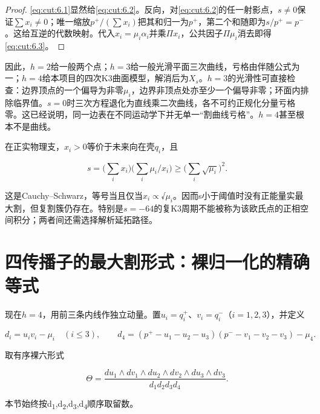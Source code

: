 \documentclass[11pt,a4paper,oneside]{ctexrep}
\theoremstyle{cnplain}
\theoremstyle{definition}
\theoremstyle{remark}
\begin{document}
\begin{proof}

\eqref{eq:cut:6.1}显然给\eqref{eq:cut:6.2}。反向，对\eqref{eq:cut:6.2}的任一射影点，\(s\ne 0\)保证\(\sum x_i\ne 0\)；唯一缩放\(p^+/(\sum x_i)\)把其和归一为\(p^+\)，第二个和随即为\(s/p^+=p^-\)。这给互逆的代数映射。代入\(x_i=\mu _i\alpha _i\)并乘\(\Pi x_i\)，公共因子\(\Pi \mu _i\)消去即得\eqref{eq:cut:6.3}。

\end{proof}

因此，\(h=2\)给一般两个点；\(h=3\)给一般光滑平面三次曲线，亏格由伴随公式为一；\(h=4\)给本项目的四次K3曲面模型，解消后为\(X_s\)。\(h=3\)的光滑性可直接检查：边界顶点的一个偏导为非零\(\mu _i\)，边界非顶点处亦至少一个偏导非零；环面内排除临界值。\(s=0\)时三次方程退化为直线乘二次曲线，各不可约正规化分量亏格零。这已经说明，同一边表在不同运动学下并无单一``割曲线亏格''。\(h=4\)甚至根本不是曲线。

在正实物理支，\(x_i>0\)等价于未来向在壳\(q_i\)，且

\begin{equation}
s=\Big(\sum_i x_i\Big)\Big(\sum_i\mu_i/x_i\Big)
          \geq\Big(\sum_i\sqrt{\mu_i}\Big)^2.          \label{eq:cut:6.4}
\end{equation}

这是Cauchy--Schwarz，等号当且仅当\(x_i\propto \)√\(\mu _i\)。因而s小于阈值时没有正能量实最大割，但复割簇仍存在。特别是\(s=- 64\)的复K3周期不能被称为该欧氏点的正相空间积分；两者间还需选择解析延拓路径。

\section{四传播子的最大割形式：裸归一化的精确等式}\label{sec:cut:7}

现在\(h=4\)，用前三条内线作独立动量。置\(u_i=q_i^+\)、\(v_i=q_i^-\)（\(i=1,2,3\)），并定义

\begin{equation}
d_i=u_iv_i-\mu_i\quad(i\leq3),\qquad
 d_4=(p^+-u_1-u_2-u_3)(p^--v_1-v_2-v_3)-\mu_4.
\end{equation}

取有序裸六形式

\begin{equation}
\Theta=\frac{du_1\wedge dv_1\wedge du_2\wedge dv_2
                          \wedge du_3\wedge dv_3}
                         {d_1d_2d_3d_4}.              \label{eq:cut:7.1}
\end{equation}

本节始终按d\textsubscript{1},d\textsubscript{2},d\textsubscript{3},d\textsubscript{4}顺序取留数。
\end{document}
